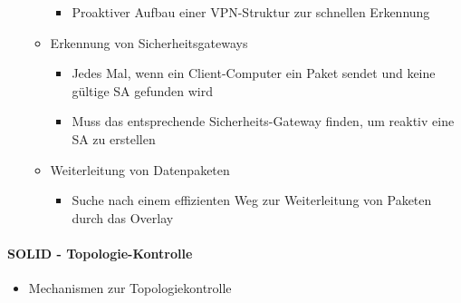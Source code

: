 \documentclass[a4paper]{article}
\begin{document}
\begin{multicols}{3}
\begin{itemize}
\begin{itemize}
                        \begin{itemize}
                            \item
                                  Proaktiver Aufbau einer VPN-Struktur zur schnellen Erkennung
                        \end{itemize}
                  \item
                        Erkennung von Sicherheitsgateways

                        \begin{itemize}
                            \item
                                  Jedes Mal, wenn ein Client-Computer ein Paket sendet und keine
                                  gültige SA gefunden wird
                            \item
                                  Muss das entsprechende Sicherheits-Gateway finden, um reaktiv eine
                                  SA zu erstellen
                        \end{itemize}
                  \item
                        Weiterleitung von Datenpaketen

                        \begin{itemize}
                            \item
                                  Suche nach einem effizienten Weg zur Weiterleitung von Paketen
                                  durch das Overlay
                        \end{itemize}
              \end{itemize}
    \end{itemize}


    \paragraph{SOLID -
        Topologie-Kontrolle}

    \begin{itemize}
        \item
              Mechanismen zur Topologiekontrolle


\end{itemize}
\end{multicols}
\end{document}
